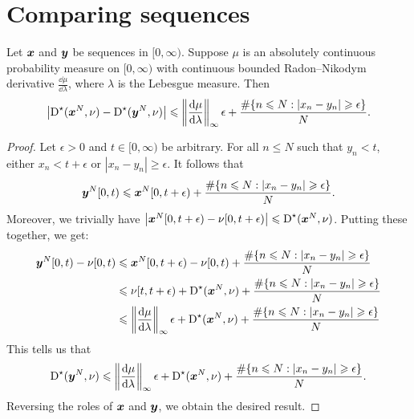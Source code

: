 \section{Comparing sequences}

\begin{lemma}\label{lem:disc-of-two-seq}
Let ${\boldsymbol x}$ and ${\boldsymbol y}$ be sequences in $[0,\infty)$. Suppose $\mu$ is an 
absolutely continuous probability measure on $[0,\infty)$ with continuous 
bounded Radon--Nikodym derivative $\frac{\dd \mu}{\dd\lambda}$, where 
$\lambda$ is the Lebesgue measure. Then 
\[
	\left|\operatorname{D}^\star({\boldsymbol x}^N, \nu) - \operatorname{D}^\star({\boldsymbol y}^N,\nu)\right| \leqslant \left\|\frac{\mathrm{d}\mu}{\mathrm{d}\lambda}\right\|_\infty \epsilon + \frac{\#\{ n\leqslant N : |x_n - y_n| \geqslant \epsilon\}}{N} .
\]
\end{lemma}
\begin{proof}
Let $\epsilon>0$ and $t\in [0,\infty)$ be arbitrary. For all $n\leqslant N$ 
such that $y_n<t$, either $x_n < t+\epsilon$ or 
$|x_n - y_n| \geqslant \epsilon$. It follows that 
\[
	{\boldsymbol y}^N[0,t) \leqslant {\boldsymbol x}^N[0,t+\epsilon) + \frac{\#\{ n\leqslant N : |x_n - y_n| \geqslant \epsilon\}}{N} .
\]
Moreover, we trivially have 
$\left| {\boldsymbol x}^N[0,t+\epsilon) - \nu[0,t+\epsilon)\right| \leqslant \operatorname{D}^\star({\boldsymbol x}^N,\nu)$. Putting these together, we get: 
\begin{align*}
	{\boldsymbol y}^N[0,t) - \nu[0,t) 
		&\leqslant {\boldsymbol x}^N[0,t+\epsilon) - \nu[0,t) + \frac{\#\{ n\leqslant N : |x_n - y_n| \geqslant \epsilon\}}{N} \\
		&\leqslant \nu[t,t+\epsilon) + \operatorname{D}^\star({\boldsymbol x}^N,\nu) + \frac{\#\{ n\leqslant N : |x_n - y_n| \geqslant \epsilon\}}{N} \\
		&\leqslant \left\|\frac{\mathrm{d}\mu}{\mathrm{d}\lambda}\right\|_\infty \epsilon + \operatorname{D}^\star({\boldsymbol x}^N,\nu) + \frac{\#\{ n\leqslant N : |x_n - y_n| \geqslant \epsilon\}}{N} 
\end{align*}
This tells us that 
\[
	\operatorname{D}^\star({\boldsymbol y}^N,\nu) \leqslant \left\|\frac{\mathrm{d}\mu}{\mathrm{d}\lambda}\right\|_\infty \epsilon + \operatorname{D}^\star({\boldsymbol x}^N,\nu) + \frac{\#\{ n\leqslant N : |x_n - y_n| \geqslant \epsilon\}}{N} .
\]
Reversing the roles of ${\boldsymbol x}$ and ${\boldsymbol y}$, we obtain the desired result. 
\end{proof}

